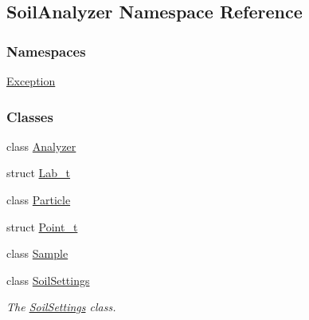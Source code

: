 \hypertarget{namespace_soil_analyzer}{}\subsection{Soil\+Analyzer Namespace Reference}
\label{namespace_soil_analyzer}
\subsubsection*{Namespaces}
\begin{DoxyCompactItemize}
\item 
 \hyperlink{namespace_soil_analyzer_1_1_exception}{Exception}
\end{DoxyCompactItemize}
\subsubsection*{Classes}
\begin{DoxyCompactItemize}
\item 
class \hyperlink{class_soil_analyzer_1_1_analyzer}{Analyzer}
\item 
struct \hyperlink{struct_soil_analyzer_1_1_lab__t}{Lab\+\_\+t}
\item 
class \hyperlink{class_soil_analyzer_1_1_particle}{Particle}
\item 
struct \hyperlink{struct_soil_analyzer_1_1_point__t}{Point\+\_\+t}
\item 
class \hyperlink{class_soil_analyzer_1_1_sample}{Sample}
\item 
class \hyperlink{class_soil_analyzer_1_1_soil_settings}{Soil\+Settings}
\begin{DoxyCompactList}\small\item\em The \hyperlink{class_soil_analyzer_1_1_soil_settings}{Soil\+Settings} class. \end{DoxyCompactList}\end{DoxyCompactItemize}
